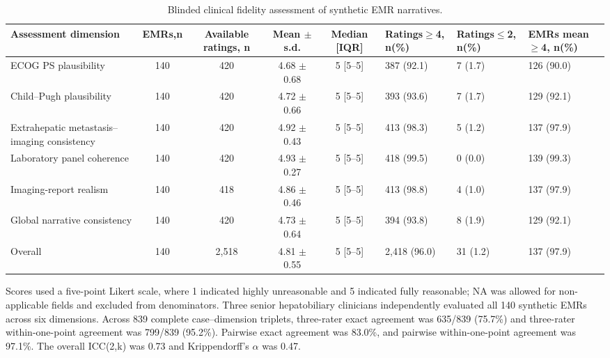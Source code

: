 \documentclass{article}
\begin{document}
\begin{table}[htbp]
\centering
\small
\setlength{\tabcolsep}{1.8pt}
\renewcommand{\arraystretch}{1.15}
\caption{Blinded clinical fidelity assessment of synthetic EMR narratives.}
\label{tab:synthetic_emr_fidelity}
\begin{threeparttable}
\begin{tabular}{p{3.3cm}ccccp{1.9cm}p{1.9cm}p{2.0cm}}
\toprule
\textbf{Assessment dimension} & \textbf{EMRs,n} & \textbf{Available ratings, n} & \textbf{Mean $\pm$ s.d.} & \textbf{Median [IQR]} & \textbf{Ratings$\geq$4, n(\%)} & \textbf{Ratings$\leq$2, n(\%)} & \textbf{EMRs mean $\geq$4, n(\%)} \\
\midrule
ECOG PS plausibility & 140 & 420 & 4.68 $\pm$ 0.68 & 5 [5--5] & 387 (92.1) & 7 (1.7) & 126 (90.0) \\
Child--Pugh plausibility & 140 & 420 & 4.72 $\pm$ 0.66 & 5 [5--5] & 393 (93.6) & 7 (1.7) & 129 (92.1) \\
Extrahepatic metastasis--imaging consistency & 140 & 420 & 4.92 $\pm$ 0.43 & 5 [5--5] & 413 (98.3) & 5 (1.2) & 137 (97.9) \\
Laboratory panel coherence & 140 & 420 & 4.93 $\pm$ 0.27 & 5 [5--5] & 418 (99.5) & 0 (0.0) & 139 (99.3) \\
Imaging-report realism & 140 & 418 & 4.86 $\pm$ 0.46 & 5 [5--5] & 413 (98.8) & 4 (1.0) & 137 (97.9) \\
Global narrative consistency & 140 & 420 & 4.73 $\pm$ 0.64 & 5 [5--5] & 394 (93.8) & 8 (1.9) & 129 (92.1) \\
\midrule
Overall & 140 & 2,518 & 4.81 $\pm$ 0.55 & 5 [5--5] & 2,418 (96.0) & 31 (1.2) & 137 (97.9) \\
\bottomrule
\end{tabular}
\begin{tablenotes}[flushleft]
\footnotesize
\item Scores used a five-point Likert scale, where 1 indicated highly unreasonable and 5 indicated fully reasonable; NA was allowed for non-applicable fields and excluded from denominators. Three senior hepatobiliary clinicians independently evaluated all 140 synthetic EMRs across six dimensions. Across 839 complete case--dimension triplets, three-rater exact agreement was 635/839 (75.7\%) and three-rater within-one-point agreement was 799/839 (95.2\%). Pairwise exact agreement was 83.0\%, and pairwise within-one-point agreement was 97.1\%. The overall ICC(2,k) was 0.73 and Krippendorff's $\alpha$ was 0.47.
\end{tablenotes}
\end{threeparttable}
\end{table}
\end{document}
